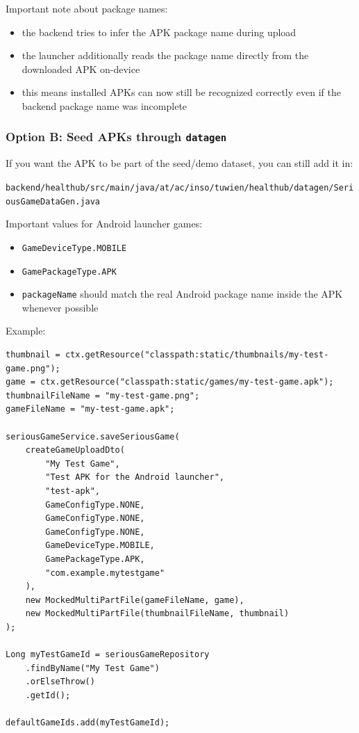 Important note about package names:

\begin{itemize}
\tightlist
\item
  the backend tries to infer the APK package name during upload
\item
  the launcher additionally reads the package name directly from the
  downloaded APK on-device
\item
  this means installed APKs can now still be recognized correctly even
  if the backend package name was incomplete
\end{itemize}

\subsubsection{Option B: Seed APKs through \texttt{datagen}}\label{option-b-seed-apks-through-datagen}

If you want the APK to be part of the seed/demo dataset, you can still
add it in:

\texttt{backend/healthub/src/main/java/at/ac/inso/tuwien/healthub/datagen/SeriousGameDataGen.java}

Important values for Android launcher games:

\begin{itemize}
\tightlist
\item
  \texttt{GameDeviceType.MOBILE}
\item
  \texttt{GamePackageType.APK}
\item
  \texttt{packageName} should match the real Android package name inside
  the APK whenever possible
\end{itemize}

Example:

\begin{lstlisting}
thumbnail = ctx.getResource("classpath:static/thumbnails/my-test-game.png");
game = ctx.getResource("classpath:static/games/my-test-game.apk");
thumbnailFileName = "my-test-game.png";
gameFileName = "my-test-game.apk";

seriousGameService.saveSeriousGame(
    createGameUploadDto(
        "My Test Game",
        "Test APK for the Android launcher",
        "test-apk",
        GameConfigType.NONE,
        GameConfigType.NONE,
        GameConfigType.NONE,
        GameDeviceType.MOBILE,
        GamePackageType.APK,
        "com.example.mytestgame"
    ),
    new MockedMultiPartFile(gameFileName, game),
    new MockedMultiPartFile(thumbnailFileName, thumbnail)
);

Long myTestGameId = seriousGameRepository
    .findByName("My Test Game")
    .orElseThrow()
    .getId();

defaultGameIds.add(myTestGameId);
\end{lstlisting}

